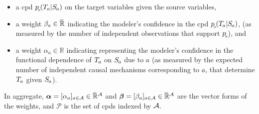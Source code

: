 \documentclass[twoside]{article}
\begin{document}
\begin{defn}
\begin{itemize}[itemsep=0pt]
        \item a cpd $p\ssub a (\Tgt a | \Src a)$ on the target variables given the source variables,
        \item a weight $\beta_a \in \mskip1mu\overline{\mskip-1mu\mathbb R\!}\,$ indicating
            the modeler's confidence in the cpd $p\ssub a(\Tgt a | \Src a)$,
            (as measured by the number of independent observations that support $p_{\!_{a}\!}$), 
            and
        \item 
    a weight $\alpha_a \in \mathbb R$ indicating
    representing
    the modeler's confidence in the functional dependence of $\Tgt a$ on $\Src a$ due to $a$
    (as measured by the expected number of independent causal mechanisms corresponding to $a$,
    that determine $\Tgt a$ given $\Src a$).%
    \end{itemize}
    In aggregate, $\boldsymbol\alpha = [\alpha_a]_{a \in \mathcal A} \in \mskip1mu\overline{\mskip-1mu\mathbb R\!}\,^\mathcal A$ and $\boldsymbol\beta = [\beta_a]_{a \in \mathcal A} \in \mskip1mu\overline{\mskip-1mu\mathbb R\!}\,^\mathcal A$ are the vector forms of the weights, and
    $\mathcal P$ is the set of cpds indexed by $\mathcal A$.
\end{defn}
\end{document}
